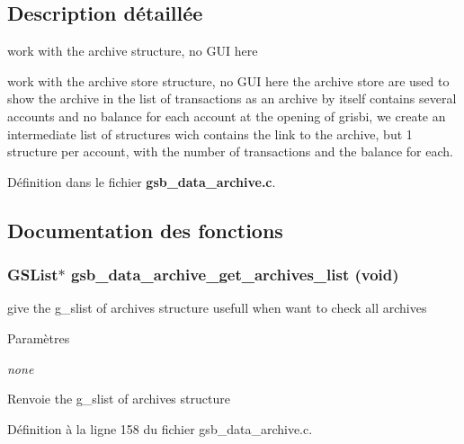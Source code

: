 \subsection{Description détaillée}
work with the archive structure, no GUI here

work with the archive store structure, no GUI here the archive store are used to show the archive in the list of transactions as an archive by itself contains several accounts and no balance for each account at the opening of grisbi, we create an intermediate list of structures wich contains the link to the archive, but 1 structure per account, with the number of transactions and the balance for each. 

Définition dans le fichier {\bf gsb\_\-data\_\-archive.c}.



\subsection{Documentation des fonctions}
\subsubsection[{gsb\_\-data\_\-archive\_\-get\_\-archives\_\-list}]{\setlength{\rightskip}{0pt plus 5cm}GSList$\ast$ gsb\_\-data\_\-archive\_\-get\_\-archives\_\-list (void)}\label{gsb__data__archive_8c_a7d5b3a8b5e99a9bbe14f526ab3d1936b}
give the g\_\-slist of archives structure usefull when want to check all archives


\begin{DoxyParams}{Paramètres}
\item[{\em none}]\end{DoxyParams}
\begin{DoxyReturn}{Renvoie}
the g\_\-slist of archives structure 
\end{DoxyReturn}


Définition à la ligne 158 du fichier gsb\_\-data\_\-archive.c.

